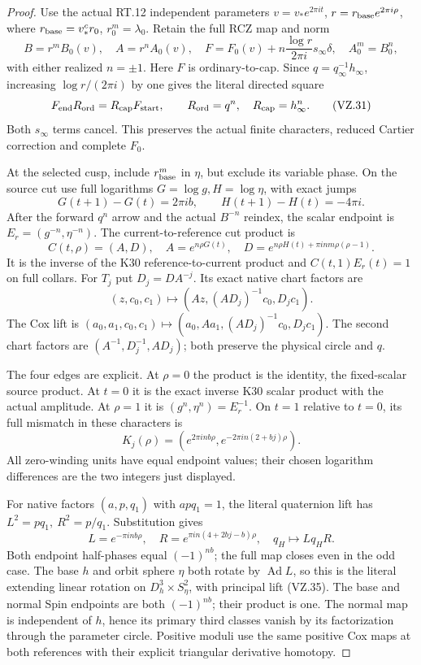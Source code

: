 \begin{proof}
Use the actual RT.12 independent parameters
\(v=v_*e^{2\pi it}\), \(r=r_{\rm base}e^{2\pi i\rho}\),
where \(r_{\rm base}=v_*^c r_0\), \(r_0^m=\lambda_0\).
Retain the full RCZ map and norm
\[
 B=r^mB_0(v),\quad A=r^nA_0(v),\quad
 F=F_0(v)+n\frac{\log r}{2\pi i}s_\infty\delta,\quad A_0^m=B_0^n,
                                                               \tag{VZ.30}
\]
with either realized \(n=\pm1\). Here \(F\) is ordinary-to-cap.
Since \(q=q_\infty^{-1}h_\infty\), increasing \(\log r/(2\pi i)\)
by one gives the literal directed square
\[
 F_{\rm end}R_{\rm ord}=R_{\rm cap}F_{\rm start},\qquad
 R_{\rm ord}=q^n,\quad R_{\rm cap}=h_\infty^n.         \tag{VZ.31}
\]
Both \(s_\infty\) terms cancel. This preserves the actual finite
characters, reduced Cartier correction and complete \(F_0\).

At the selected cusp, include \(r_{\rm base}^m\) in \(\eta\), but
exclude its variable phase. On the source cut use full logarithms
\(G=\log g,H=\log\eta\), with exact jumps
\[
 G(t+1)-G(t)=2\pi ib,\qquad H(t+1)-H(t)=-4\pi i.
\]
After the forward \(q^n\) arrow and the actual \(B^{-n}\) reindex,
the scalar endpoint is \(E_r=(g^{-n},\eta^{-n})\).
The current-to-reference cut product is
\[
 C(t,\rho)=(A,D),\quad
 A=e^{n\rho G(t)},\quad
 D=e^{n\rho H(t)+\pi inm\rho(\rho-1)}.                \tag{VZ.32}
\]
It is the inverse of the K30 reference-to-current product and
\(C(t,1)E_r(t)=1\) on full collars. For \(T_j\) put
\(D_j=DA^{-j}\). Its exact native chart factors are
\[
 (z,c_0,c_1)\longmapsto
 (Az,(AD_j)^{-1}c_0,D_jc_1).                         \tag{VZ.33}
\]
The Cox lift is
\((a_0,a_1,c_0,c_1)\mapsto
(a_0,Aa_1,(AD_j)^{-1}c_0,D_jc_1)\).
The second chart factors are \((A^{-1},D_j^{-1},AD_j)\);
both preserve the physical circle and \(q\).

The four edges are explicit. At \(\rho=0\) the product is the identity,
the fixed-scalar source product. At \(t=0\) it is the exact inverse
K30 scalar product with the actual amplitude. At \(\rho=1\) it is
\((g^n,\eta^n)=E_r^{-1}\). On \(t=1\) relative to \(t=0\), its full
mismatch in these characters is
\[
 K_j(\rho)=
 (e^{2\pi inb\rho},e^{-2\pi in(2+bj)\rho}).           \tag{VZ.34}
\]
All zero-winding units have equal endpoint values; their chosen
logarithm differences are the two integers just displayed.

For native factors \((a,p,q_1)\) with \(apq_1=1\), the literal
quaternion lift has \(L^2=pq_1,\ R^2=p/q_1\).
Substitution gives
\[
 L=e^{-\pi inb\rho},\quad
 R=e^{\pi in(4+2bj-b)\rho},\quad q_H\longmapsto Lq_HR.
                                                               \tag{VZ.35}
\]
Both endpoint half-phases equal \((-1)^{nb}\); the full map closes
even in the odd case. The base \(h\) and orbit sphere \(\eta\) both
rotate by \(\operatorname{Ad}L\), so this is the literal extending
linear rotation on \(D^3_h\times S^2_\eta\), with principal lift
(VZ.35). The base and normal Spin endpoints are both \((-1)^{nb}\);
their product is one. The normal map is independent of \(h\), hence
its primary third classes vanish by its factorization through the
parameter circle. Positive moduli use the same positive Cox maps at
both references with their explicit triangular derivative homotopy.


\end{proof}
